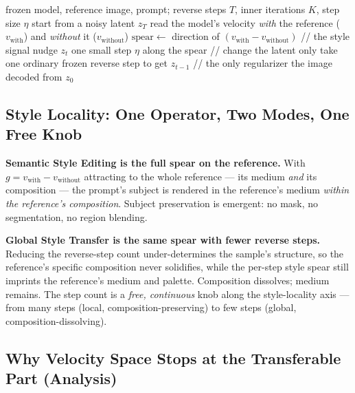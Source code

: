 \documentclass[letterpaper]{article} %
\begin{document}
\begin{algorithm}[t]
\caption{TSD inference (one style transfer)}
\label{alg:tsd}
\begin{algorithmic}[1]
\REQUIRE frozen model, reference image, prompt; reverse steps $T$, inner
iterations $K$, step size $\eta$
\STATE start from a noisy latent $z_T$
    \STATE read the model's velocity \emph{with} the reference
    ($v_{\text{with}}$) and \emph{without} it ($v_{\text{without}}$)
    \STATE $\mathrm{spear}\gets$ direction of
    $(v_{\text{with}}-v_{\text{without}})$ \hfill// the style signal
    \STATE nudge $z_t$ one small step $\eta$ along the spear
    \hfill// change the latent only
  \ENDFOR
  \STATE take one ordinary frozen reverse step to get $z_{t-1}$
  \hfill// the only regularizer
\ENDFOR
\RETURN the image decoded from $z_0$
\end{algorithmic}
\end{algorithm}

\subsection{Style Locality: One Operator, Two Modes, One Free Knob}

\textbf{Semantic Style Editing is the full spear on the reference.} With
$g=v_{\text{with}}-v_{\text{without}}$ attracting to the whole reference ---
its medium \emph{and} its composition --- the prompt's subject is rendered in
the reference's medium \emph{within the reference's composition}. Subject
preservation is emergent: no mask, no segmentation, no region blending.

\textbf{Global Style Transfer is the same spear with fewer reverse steps.}
Reducing the reverse-step count under-determines the sample's structure, so
the reference's specific composition never solidifies, while the per-step
style spear still imprints the reference's medium and palette. Composition
dissolves; medium remains. The step count is a \emph{free, continuous} knob
along the style-locality axis --- from many steps (local,
composition-preserving) to few steps (global, composition-dissolving).

\subsection{Why Velocity Space Stops at the Transferable Part (Analysis)}
\end{document}
